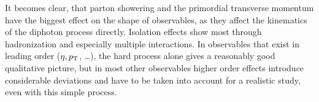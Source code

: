 It becomes clear, that parton showering and the primordial transverse
momentum have the biggest effect on the shape of observables, as they
affect the kinematics of the diphoton process directly. Isolation
effects show most through hadronization and especially multiple
interactions. In observables that exist in leading order
(\(\eta, p_\mathrm{T}\), \ldots), the hard process alone gives a reasonably
good qualitative picture, but in most other observables higher order
effects introduce considerable deviations and have to be taken into
account for a realistic study, even with this simple process.


